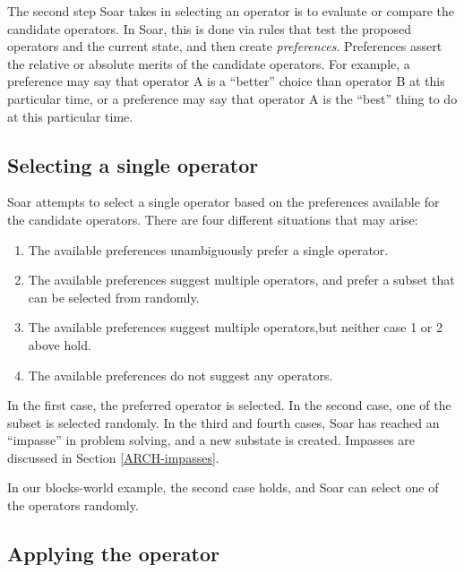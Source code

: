 The second step Soar takes in selecting an operator is to evaluate or
compare the candidate operators. In Soar, this is done via rules that
test the proposed operators and the current state, and then create
\emph{preferences}.  Preferences assert the relative or absolute merits of the
candidate operators. For example, a preference may say that operator A
is a ``better'' choice than operator B at this particular time, or a
preference may say that operator A is the ``best'' thing to do at this
particular time.

\subsection{Selecting a single operator}

Soar attempts to select a single operator based on the preferences available
for the candidate operators. There are four different situations that may
arise:\vspace{-14pt}
\begin{enumerate}
\item The available preferences unambiguously prefer a single operator.\vspace{-
6pt}
\item The available preferences suggest multiple operators, and 
       prefer a subset that can be selected from randomly.\vspace{-6pt}
\item The available preferences suggest multiple operators,but neither case
       1 or 2 above hold.\vspace{-6pt}
\item The available preferences do not suggest any operators.
\end{enumerate}

In the first case, the preferred operator is selected.  In the second
case, one of the subset is selected randomly. In the third and fourth
cases, Soar has reached an ``impasse'' in problem solving, and a new
substate is created.  Impasses are discussed in Section
\ref{ARCH-impasses}.

In our blocks-world example, the second case holds, and Soar can select one of
the operators randomly.

\subsection{Applying the operator}

